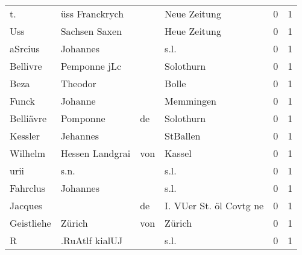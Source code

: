 \begin{center}
\begin{tiny}
\begin{longtabu}{llllrr}
                       t. &                     üss Franckrych &             &                                Neue Zeitung &          0 &         1 \\
                      Uss &                      Sachsen Saxen &             &                                Heue Zeitung &          0 &         1 \\
                  aSrcius &                           Johannes &             &                                        s.l. &          0 &         1 \\
                 Bellivre &                       Pemponne jLc &             &                                   Solothurn &          0 &         1 \\
                     Beza &                            Theodor &             &                                       Bolle &          0 &         1 \\
                    Funck &                            Johanne &             &                                   Memmingen &          0 &         1 \\
                Belliävre &                           Pomponne &          de &                                   Solothurn &          0 &         1 \\
                  Kessler &                           Jehannes &             &                                    StBallen &          0 &         1 \\
                  Wilhelm &                    Hessen Landgrai &         von &                                      Kassel &          0 &         1 \\
                     urii &                               s.n. &             &                                        s.l. &          0 &         1 \\
                 Fahrclus &                           Johannes &             &                                        s.l. &          0 &         1 \\
                  Jacques &                                    &          de &                     I. VUer St. öl Covtg ne &          0 &         1 \\
               Geistliehe &                             Zürich &         von &                                      Zürich &          0 &         1 \\
                        R &                     .RuAtlf kialUJ &             &                                        s.l. &          0 &         1 \\

\end{longtabu}
\end{tiny}
\end{center}
